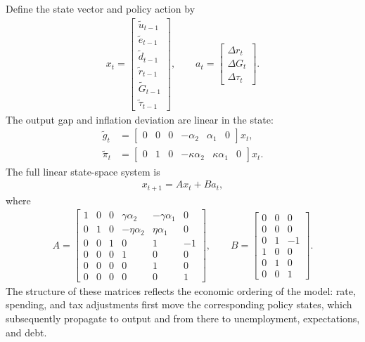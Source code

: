 \documentclass[11pt]{article}
\begin{document}
Define the state vector and policy action by
\begin{align*}
    x_t = \begin{bmatrix}
        \tilde u_{t-1} \\
        \tilde e_{t-1} \\
        \tilde d_{t-1} \\
        \tilde r_{t-1} \\
        \tilde G_{t-1} \\
        \tilde \tau_{t-1}
    \end{bmatrix},
    \qquad
    a_t = \begin{bmatrix}
        \Delta r_t \\
        \Delta G_t \\
        \Delta \tau_t
    \end{bmatrix}.
\end{align*}
The output gap and inflation deviation are linear in the state:
\begin{align*}
    \tilde g_t &= \begin{bmatrix} 0&0&0&-\alpha_2&\alpha_1&0 \end{bmatrix}x_t, \\
    \tilde \pi_t &= \begin{bmatrix} 0&1&0&-\kappa\alpha_2&\kappa\alpha_1&0 \end{bmatrix}x_t.
\end{align*}
The full linear state-space system is
\begin{align}
    x_{t+1} = Ax_t+Ba_t,
\end{align}
where
\begin{align*}
    A
    =
    \begin{bmatrix}
        1&0&0&\gamma\alpha_2&-\gamma\alpha_1&0\\
        0&1&0&-\eta\alpha_2&\eta\alpha_1&0\\
        0&0&1&0&1&-1\\
        0&0&0&1&0&0\\
        0&0&0&0&1&0\\
        0&0&0&0&0&1
    \end{bmatrix},
    \qquad
    B
    =
    \begin{bmatrix}
        0&0&0\\
        0&0&0\\
        0&1&-1\\
        1&0&0\\
        0&1&0\\
        0&0&1
    \end{bmatrix}.
\end{align*}
The structure of these matrices reflects the economic ordering of the model: rate, spending, and tax adjustments first move the corresponding policy states, which subsequently propagate to output and from there to unemployment, expectations, and debt.
\end{document}
